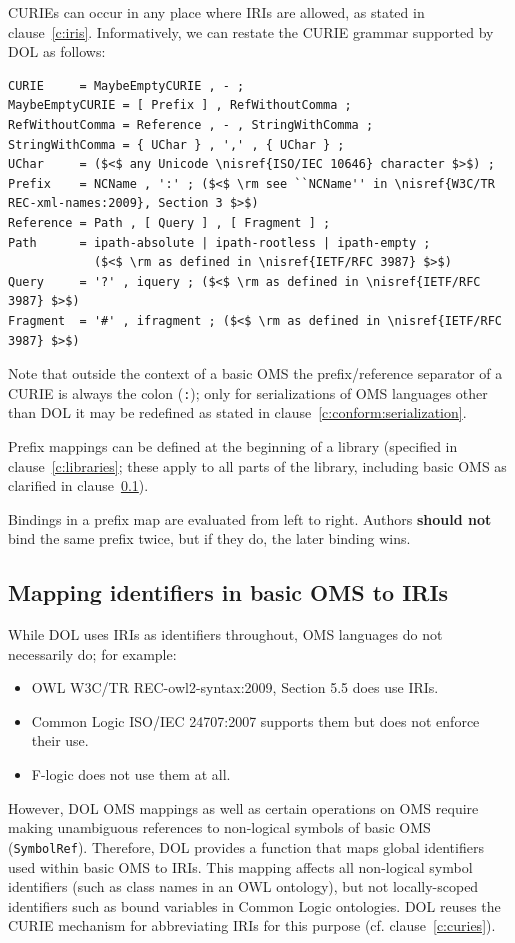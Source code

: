 \documentclass[10pt,fleqn,%
\ifpretendfinal
final%
\else
draft%
\fi,
]{scrreprt}
\makeatletter
\newcommand*{\cf}{cf.\@\xspace}
\newcommand*\CommentAuthor{}
\renewcommand*\CommentAuthor{#1}}
\newcommand*\CommentDate{}
\renewcommand*\CommentDate{#1}}
\newcommand*\CommentId{}
\renewcommand*\CommentId{#1}}
\newcommand*\CommentType{}
\renewcommand*\CommentType{#1}}
\newcommand*{\SetCommentColorByType}[1]{%
\edef\localType{{#1}}%
\expandafter\ifstrequal\localType{q-aut}{\colorlet{CommentColor}{red}}{%
\expandafter\ifstrequal\localType{q-all}{\colorlet{CommentColor}{orange}}{%
\expandafter\ifstrequal\localType{todo}{\colorlet{CommentColor}{orange}}{%
\expandafter\ifstrequal\localType{fyi}{\colorlet{CommentColor}{lightgray}}{%
\colorlet{CommentColor}{yellow}}}}}}
\newcommand*{\SetCommentPrefixByType}[1]{%
\edef\localType{{#1}}%
\expandafter\@ifmtarg\localType{%
\edef\CommentPrefix{}%
}{%
\caseupper[q]{#1}%
\edef\CommentPrefix{\thestring: }%
}}
\newcommand*{\initComment}[1]{%
\setkeys{Comment}{#1}%
\SetCommentColorByType{\CommentType}%
\relax%
\SetCommentPrefixByType{\CommentType}%
\relax%
}
\newcommand*{\todonote}[2][]{%
\initComment{#1}%
\pdfcomment[author=\CommentAuthor,color=CommentColor,date=\CommentDate,id=\CommentId]{%
\CommentPrefix
#2}}
\renewcommand*{\todonote}[2][]{%
\initComment{#1}%
\ednote{\CommentPrefix #2}}
\newcommand*{\CLnote}[2][author=Christoph Lange]{%
\todonote[author=Christoph Lange,#1]{#2} 
}
\newcommand*{\syntax}[1]{\texttt{#1}}
\newcommand*{\shouldnot}{\textbf{should not}\xspace}
\newcommand{\clauserefname}{clause}
\newcommand{\cref}[1]{\clauserefname~\ref{#1}}
\newcommand{\ssclause}[1]{\subsection{#1}}
\newcommand{\nisref}[1]{#1}
\makeatother
\begin{document}
CURIEs can occur in any place where IRIs are allowed, as stated in \cref{c:iris}.  Informatively, 
we can restate the CURIE grammar supported by DOL as follows:
\begin{lstlisting}[language=ebnf,escapeinside={()}]
CURIE     = MaybeEmptyCURIE , - ;
MaybeEmptyCURIE = [ Prefix ] , RefWithoutComma ;
RefWithoutComma = Reference , - , StringWithComma ;
StringWithComma = { UChar } , ',' , { UChar } ;
UChar     = ($<$ any Unicode \nisref{ISO/IEC 10646} character $>$) ;
Prefix    = NCName , ':' ; ($<$ \rm see ``NCName'' in \nisref{W3C/TR REC-xml-names:2009}, Section 3 $>$)
Reference = Path , [ Query ] , [ Fragment ] ;
Path      = ipath-absolute | ipath-rootless | ipath-empty ;
            ($<$ \rm as defined in \nisref{IETF/RFC 3987} $>$)
Query     = '?' , iquery ; ($<$ \rm as defined in \nisref{IETF/RFC 3987} $>$)
Fragment  = '#' , ifragment ; ($<$ \rm as defined in \nisref{IETF/RFC 3987} $>$) 
\end{lstlisting}

Note that outside the context of a basic OMS the prefix/reference separator of a CURIE is always the colon (\syntax{:}); only for serializations of OMS languages other than DOL it may be redefined as stated in \cref{c:conform:serialization}.

Prefix mappings can be defined at the beginning of a library (specified in \cref{c:libraries}; 
these apply to all parts of the library, including basic OMS as clarified in \cref{c:map-ids}).  

Bindings in a prefix map are evaluated from left to right.  Authors \shouldnot bind the same prefix twice, but if they do, the later binding wins.

\ssclause{Mapping identifiers in basic OMS to IRIs}\label{c:map-ids}

While DOL uses IRIs as identifiers throughout, OMS languages do not necessarily do; for example:
\begin{itemize}
\item OWL \nisref{W3C/TR REC-owl2-syntax:2009, Section 5.5} does use IRIs.
\item Common Logic \nisref{ISO/IEC 24707:2007} supports them but does not enforce their use.
\item F-logic \cite{flogic} does not use them at all.
\end{itemize}
However, DOL OMS mappings as well as 
certain operations on OMS require making unambiguous references to non-logical symbols of basic OMS (\syntax{SymbolRef}).  Therefore, DOL provides a function that maps global identifiers used within basic OMS to IRIs.  This mapping affects all non-logical symbol identifiers (such as class names in an OWL ontology), but not locally-scoped identifiers such as bound variables in Common Logic ontologies.  DOL reuses the CURIE mechanism for abbreviating IRIs for this purpose (\cf \cref{c:curies}).
\end{document}
